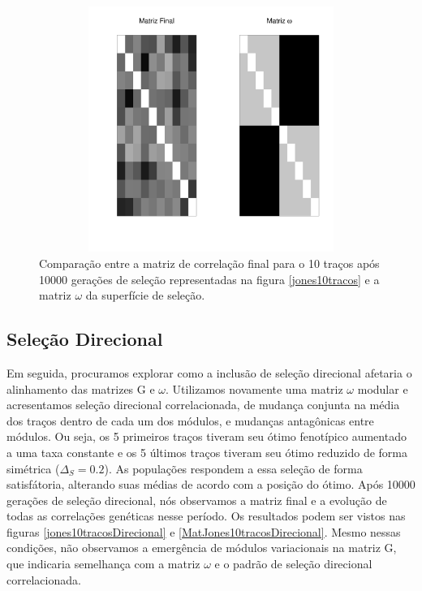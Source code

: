 \begin{center}
\begin{figure}[htbp]
  \includegraphics[width=150mm, height=80mm]{figuras/Mat10tracos}
  \caption{Comparação entre a matriz de correlação final para o 10 traços após 10000
   gerações de seleção representadas na figura \ref{jones10tracos} e a matriz $\omega$ da superfície de seleção.}
  \label{MatJones10tracos}
\end{figure}
\end{center}


\subsection{Seleção Direcional}

Em seguida, procuramos explorar como a inclusão de seleção direcional afetaria o
alinhamento das matrizes G e $\omega$. Utilizamos novamente uma matriz
$\omega$ modular e acresentamos seleção direcional correlacionada, de
mudança conjunta na média dos traços dentro de cada um dos módulos, e
mudanças antagônicas entre módulos. Ou seja, os 5 primeiros traços
tiveram seu ótimo fenotípico aumentado a uma taxa constante 
 e os 5 últimos traços tiveram seu ótimo reduzido de forma simétrica ($\Delta_S=0.2$).  As populações
respondem a essa seleção de forma satisfátoria, alterando suas médias de
acordo com a posição do ótimo. Após 10000 gerações de seleção
direcional,
nós observamos a matriz final e a evolução de todas as correlações
genéticas nesse período. Os resultados podem ser vistos nas figuras
\ref{jones10tracosDirecional} e \ref{MatJones10tracosDirecional}. Mesmo
nessas condições, não observamos a emergência de módulos variacionais na
matriz G, que indicaria semelhança com a matriz $\omega$ e o padrão de
seleção direcional correlacionada.

